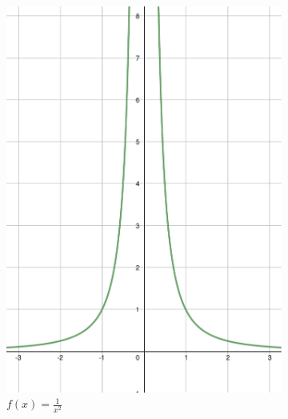 \begin{figure}[h]
    \centering
    \begin{subfigure}{0.35\textwidth}
        \includegraphics[width=\textwidth]{tex/chapter_2/assets/y=1_div_by_x^2.pdf}
        \caption*{$f(x) = \frac{1}{x^2}$}
    \end{subfigure}
    \hfill
    \begin{subfigure}{0.35\textwidth}

\end{subfigure}
\end{figure}
